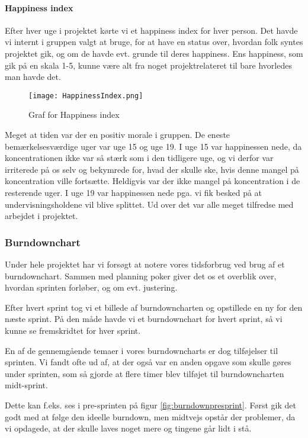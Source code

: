 \paragraph*{Happiness index}
Efter hver uge i projektet kørte vi et happiness index for hver person.
Det havde vi internt i gruppen valgt at bruge, for at have en status over, hvordan folk syntes projektet gik, og om de havde evt. grunde til deres happiness.
Ens happiness, som gik på en skala 1-5, kunne være alt fra noget projektrelateret til bare hvorledes man havde det.

\begin{figure}[h]
    \caption{Graf for Happiness index}
    \centering
        \texttt{[image: HappinessIndex.png]}
    \label{happinessindex}
\end{figure}

Meget at tiden var der en positiv morale i gruppen.
De eneste bemærkelsesværdige uger var uge 15 og uge 19.
I uge 15 var happinessen nede, da koncentrationen ikke var så stærk som i den tidligere uge, og vi derfor var irriterede på os selv og bekymrede for, hvad der skulle ske, hvis denne mangel på koncentration ville fortsætte.
Heldigvis var der ikke mangel på koncentration i de resterende uger.
I uge 19 var happinessen nede pga. vi fik besked på at undervisningsholdene vil blive splittet.
Ud over det var alle meget tilfredse med arbejdet i projektet.

\subsubsection{Burndownchart}

Under hele projektet har vi forsøgt at notere vores tidsforbrug ved brug af et burndownchart.
Sammen med planning poker giver det os et overblik over, hvordan sprinten forløber, og om evt. justering. 

Efter hvert sprint tog vi et billede af burndowncharten og opstillede en ny for den næste sprint.
På den måde havde vi et burndownchart for hvert sprint, så vi kunne se fremskridtet for hver sprint.

En af de gennemgående temaer i vores burndowncharts er dog tilføjelser til sprinten.
Vi fandt ofte ud af, at der også var en anden opgave som skulle gøres under sprinten, som så gjorde at flere timer blev tilføjet til burndowncharten midt-sprint. 

Dette kan f.eks. ses i pre-sprinten på figur \ref{fig:burndownpresprint}.
Først gik det godt med at følge den ideelle burndown, men midtvejs opstår der problemer, da vi opdagede, at der skulle laves noget mere og tingene går lidt i stå.

